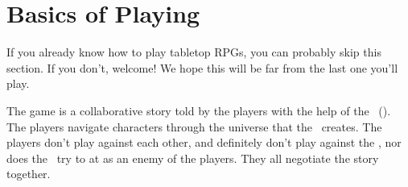 \section{Basics of Playing}
\par
If you already know how to play tabletop RPGs, you can probably skip this section. If you don't, welcome! We hope this will be far from the last one you'll play.

\par
The game is a collaborative story told by the players with the help of the \gmLong\, (\gm). The players navigate characters through the universe that the \gm\, creates. The players don't play against each other, and definitely don't play against the \gm , nor does the \gm\, try to at as an enemy of the players. They all negotiate the story together.